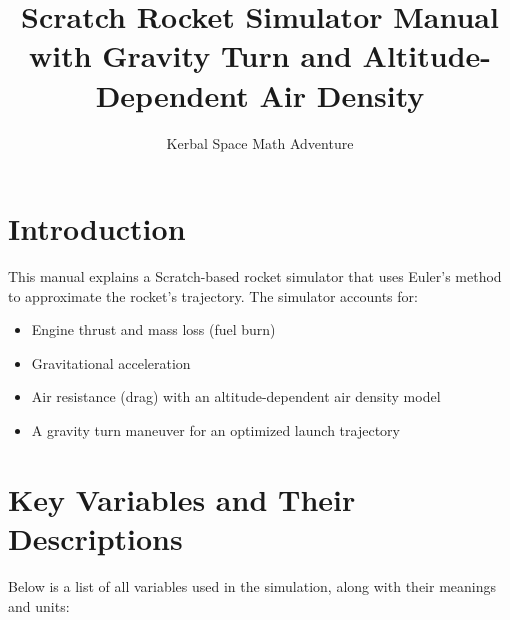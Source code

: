 \documentclass[12pt]{article}
\title{Scratch Rocket Simulator Manual with Gravity Turn and Altitude-Dependent Air Density}
\author{Kerbal Space Math Adventure}
\date{}
\begin{document}
\maketitle

\section{Introduction}
This manual explains a Scratch-based rocket simulator that uses Euler's method to approximate the rocket's trajectory. The simulator accounts for:
\begin{itemize}
    \item Engine thrust and mass loss (fuel burn)
    \item Gravitational acceleration
    \item Air resistance (drag) with an altitude-dependent air density model
    \item A gravity turn maneuver for an optimized launch trajectory
\end{itemize}

\section{Key Variables and Their Descriptions}
Below is a list of all variables used in the simulation, along with their meanings and units:
\end{document}
